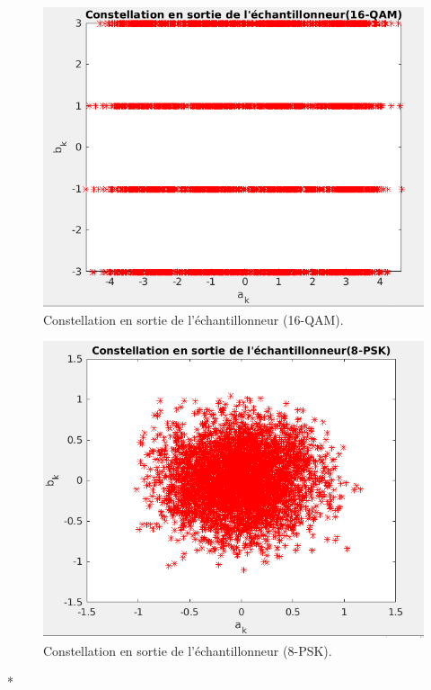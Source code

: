 \documentclass[frenchb]{article}
\begin{document}
\begin{enumerate}
\begin{itemize}
 \begin{figure}[ht!]
    \centering
    \includegraphics[width=12cm]{C316QAMconstech.png}
    \caption{Constellation en sortie de l'échantillonneur (16-QAM).}
    \label{C35}
 \end{figure}
 
 \begin{figure}[ht!]
    \centering
    \includegraphics[width=12cm]{C38PSKconstech.png}
    \caption{Constellation en sortie de l'échantillonneur (8-PSK).}
    \label{C35}
 \end{figure}*
 

\end{itemize}
\end{enumerate}
\end{document}
